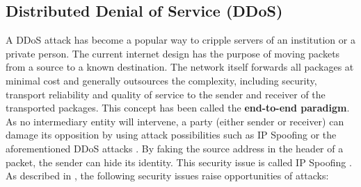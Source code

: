 \subsection{Distributed Denial of Service (DDoS)}
\label{subsec:03_ddos}


A DDoS attack has become a popular way to cripple servers of an institution or a private person. The current internet design has the purpose of moving packets from a source to a known destination. The network itself forwards all packages at minimal cost and generally outsources the complexity, including security, transport reliability and quality of service to the sender and receiver of the transported packages. This concept has been called the \textbf{end-to-end paradigm}. As no intermediary entity will intervene, a party (either sender or receiver) can damage its opposition by using attack possibilities such as IP Spoofing or the aforementioned DDoS attacks \cite{Mirkovic2004}. By faking the source address in the header of a packet, the sender can hide its identity. This security issue is called IP Spoofing \cite{Cloudflare2019}. As described in \cite{Mirkovic2004}, the following security issues raise opportunities of attacks:

